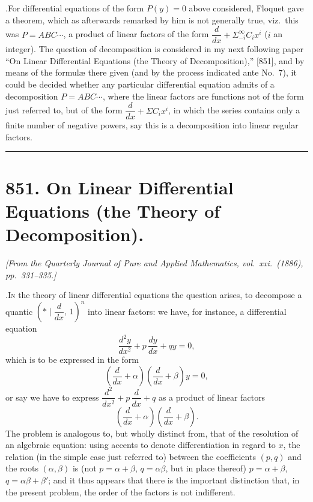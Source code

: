 \documentclass[11pt]{article}
\begin{document}
\medskip

.\quad For differential equations of the form $P(y)=0$ above considered, Floquet gave a theorem, which as afterwards remarked by him is not generally true, viz.\ this was $P = ABC\dotsb$, a product of linear factors of the form $\dfrac{d}{dx} + \Sigma_{-i}^{\infty}C_ix^i$ ($i$ an integer). The question of decomposition is considered in my next following paper ``On Linear Differential Equations (the Theory of Decomposition),'' [851], and by means of the formul\ae{} there given (and by the process indicated ante No.\ 7), it could be decided whether any particular differential equation admits of a decomposition $P = ABC\dotsb$, where the linear factors are functions not of the form just referred to, but of the form $\dfrac{d}{dx} + \Sigma C_ix^i$, in which the series contains only a finite number of negative powers, say this is a decomposition into linear regular factors.

\bigskip\bigskip
\hrule
\bigskip

\section*{851. On Linear Differential Equations (the Theory of Decomposition).}

\noindent\textit{[From the Quarterly Journal of Pure and Applied Mathematics, vol.\ xxi.\ (1886), pp.\ 331--335.]}

\medskip

.\quad \textsc{In} the theory of linear differential equations the question arises, to decompose a quantic $\left(*\mid\dfrac{d}{dx},\,1\right)^n$ into linear factors: we have, for instance, a differential equation
\[
\frac{d^2y}{dx^2} + p\,\frac{dy}{dx} + qy = 0,
\]
which is to be expressed in the form
\[
\left(\frac{d}{dx} + \alpha\right)\!\left(\frac{d}{dx} + \beta\right)y = 0,
\]
or say we have to express $\dfrac{d^2}{dx^2} + p\,\dfrac{d}{dx} + q$ as a product of linear factors
\[
\left(\frac{d}{dx} + \alpha\right)\!\left(\frac{d}{dx} + \beta\right).
\]
The problem is analogous to, but wholly distinct from, that of the resolution of an algebraic equation: using accents to denote differentiation in regard to $x$, the relation (in the simple case just referred to) between the coefficients $(p,q)$ and the roots $(\alpha,\beta)$ is (not $p = \alpha+\beta$, $q = \alpha\beta$, but in place thereof) $p = \alpha+\beta$, $q = \alpha\beta+\beta'$; and it thus appears that there is the important distinction that, in the present problem, the order of the factors is not indifferent.
\end{document}
